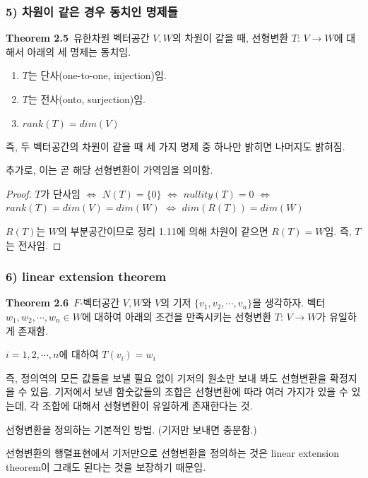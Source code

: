 \subsubsection*{5) 차원이 같은 경우 동치인 명제들}
\textbf{Theorem 2.5}\, 유한차원 벡터공간 $V,W$의 차원이 같을 때, 선형변환 $T:\,V \rightarrow W$에 대해서 아래의 세 명제는 동치임.

\begin{enumerate}
    \item $T$는 단사(one-to-one, injection)임.
    \item $T$는 전사(onto, surjection)임.
    \item $rank(T)=dim(V)$
\end{enumerate}

즉, 두 벡터공간의 차원이 같을 때 세 가지 명제 중 하나만 밝히면 나머지도 밝혀짐.

추가로, 이는 곧 해당 선형변환이 가역임을 의미함.

\begin{proof}
$T$가 단사임 $\Leftrightarrow$ $N(T)=\{0\}$ $\Leftrightarrow$ $nullity(T)=0$ $\Leftrightarrow$ $rank(T)=dim(V)=dim(W)$ $\Leftrightarrow$ $dim(R(T))=dim(W)$

$R(T)$는 $W$의 부분공간이므로 정리 1.11에 의해 차원이 같으면 $R(T)=W$임. 즉, $T$는 전사임.
\end{proof}


\subsubsection*{6) linear extension theorem}
\textbf{Theorem 2.6}\, $F$-벡터공간 $V,W$와 $V$의 기저 $\{v_1,v_2, \cdots ,v_n\}$을 생각하자. 벡터 $w_1,w_2, \cdots ,w_n \in W$에 대하여 아래의 조건을 만족시키는 선형변환 $T:\,V \rightarrow W$가 유일하게 존재함.\\

\begin{center}
$i=1,2, \cdots ,n$에 대하여 $T(v_i)=w_i$
\end{center}

즉, 정의역의 모든 값들을 보낼 필요 없이 기저의 원소만 보내 봐도 선형변환을 확정지을 수 있음. 기저에서 보낸 함숫값들의 조합은 선형변환에 따라 여러 가지가 있을 수 있는데, 각 조합에 대해서 선형변환이 유일하게 존재한다는 것.

선형변환을 정의하는 기본적인 방법. (기저만 보내면 충분함.)

선형변환의 행렬표현에서 기저만으로 선형변환을 정의하는 것은 linear extension theorem이 그래도 된다는 것을 보장하기 때문임.

